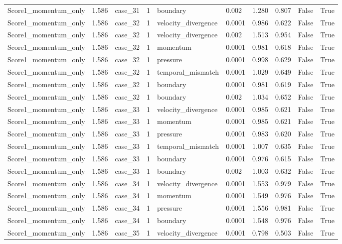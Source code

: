 \begin{longtable}{llllllllll}
Score1\_momentum\_only & 1.586 & case\_31 & 1 & boundary & 0.002 & 1.280 & 0.807 & False & True \\
Score1\_momentum\_only & 1.586 & case\_32 & 1 & velocity\_divergence & 0.0001 & 0.986 & 0.622 & False & True \\
Score1\_momentum\_only & 1.586 & case\_32 & 1 & velocity\_divergence & 0.002 & 1.513 & 0.954 & False & True \\
Score1\_momentum\_only & 1.586 & case\_32 & 1 & momentum & 0.0001 & 0.981 & 0.618 & False & True \\
Score1\_momentum\_only & 1.586 & case\_32 & 1 & pressure & 0.0001 & 0.998 & 0.629 & False & True \\
Score1\_momentum\_only & 1.586 & case\_32 & 1 & temporal\_mismatch & 0.0001 & 1.029 & 0.649 & False & True \\
Score1\_momentum\_only & 1.586 & case\_32 & 1 & boundary & 0.0001 & 0.981 & 0.619 & False & True \\
Score1\_momentum\_only & 1.586 & case\_32 & 1 & boundary & 0.002 & 1.034 & 0.652 & False & True \\
Score1\_momentum\_only & 1.586 & case\_33 & 1 & velocity\_divergence & 0.0001 & 0.985 & 0.621 & False & True \\
Score1\_momentum\_only & 1.586 & case\_33 & 1 & momentum & 0.0001 & 0.985 & 0.621 & False & True \\
Score1\_momentum\_only & 1.586 & case\_33 & 1 & pressure & 0.0001 & 0.983 & 0.620 & False & True \\
Score1\_momentum\_only & 1.586 & case\_33 & 1 & temporal\_mismatch & 0.0001 & 1.007 & 0.635 & False & True \\
Score1\_momentum\_only & 1.586 & case\_33 & 1 & boundary & 0.0001 & 0.976 & 0.615 & False & True \\
Score1\_momentum\_only & 1.586 & case\_33 & 1 & boundary & 0.002 & 1.003 & 0.632 & False & True \\
Score1\_momentum\_only & 1.586 & case\_34 & 1 & velocity\_divergence & 0.0001 & 1.553 & 0.979 & False & True \\
Score1\_momentum\_only & 1.586 & case\_34 & 1 & momentum & 0.0001 & 1.549 & 0.976 & False & True \\
Score1\_momentum\_only & 1.586 & case\_34 & 1 & pressure & 0.0001 & 1.556 & 0.981 & False & True \\
Score1\_momentum\_only & 1.586 & case\_34 & 1 & boundary & 0.0001 & 1.548 & 0.976 & False & True \\
Score1\_momentum\_only & 1.586 & case\_35 & 1 & velocity\_divergence & 0.0001 & 0.798 & 0.503 & False & True \\

\end{longtable}
